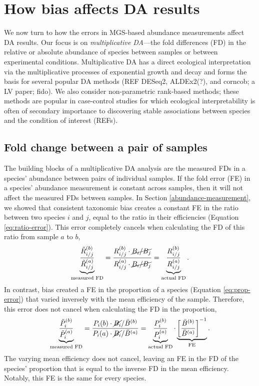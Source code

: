 \documentclass[
]{article}
\begin{document}
\hypertarget{differential-abundance}{%
\section{How bias affects DA results}\label{differential-abundance}}

We now turn to how the errors in MGS-based abundance measurements affect DA results.
Our focus is on \emph{multiplicative DA}---the fold differences (FD) in the relative or absolute abundance of species between samples or between experimental conditions.
Multiplicative DA has a direct ecological interpretation via the multiplicative processes of exponential growth and decay and forms the basis for several popular DA methods (REF DESeq2, ALDEx2(?), and corncob; a LV paper; fido).
We also consider non-parametric rank-based methods; these methods are popular in case-control studies for which ecological interpretability is often of secondary importance to discovering stable associations between species and the condition of interest (REFs).

\hypertarget{fold-change-between-a-pair-of-samples}{%
\subsection{Fold change between a pair of samples}\label{fold-change-between-a-pair-of-samples}}

The building blocks of a multiplicative DA analysis are the measured FDs in a species' abundance between pairs of individual samples.
If the fold error (FE) in a species' abundance measurement is constant across samples, then it will not affect the measured FDs between samples.
In Section \ref{abundance-measurement}, we showed that consistent taxonomic bias creates a constant FE in the ratio between two species \(i\) and \(j\), equal to the ratio in their efficiencies (Equation \eqref{eq:ratio-error}).
This error completely cancels when calculating the FD of this ratio from sample \(a\) to \(b\),
\begin{align}
  \label{eq:ratio-fc-error}
\underbrace{\frac{\tilde R_{i/j}^{(b)}}{\tilde R_{i/j}^{(a)}}}_\text{measured FD}
  = \frac
    {R_{i/j}^{(b)} \cdot \cancel{B_i / B_j}}
    {R_{i/j}^{(a)} \cdot \cancel{B_i / B_j}}
  =
  \underbrace{\frac{R_{i/j}^{(b)}}{R_{i/j}^{(a)}}}_\text{actual FD}
  .
\end{align}
In contrast, bias created a FE in the proportion of a species (Equation \eqref{eq:prop-error}) that varied inversely with the mean efficiency of the sample.
Therefore, this error does not cancel when calculating the FD in the proportion,
\begin{align}
  \label{eq:prop-fc-error}
\underbrace{\frac{\tilde P_i^{(b)}}{\tilde P_i^{(a)}}}_\text{measured FD}
  = \frac
    {P_i(b) \cdot \cancel{B_i} / \bar B^{(b)}}
    {P_i(a) \cdot \cancel{B_i} / \bar B^{(a)}}
  =
  \underbrace{\frac{P_i^{(b)}}{P_i^{(a)}}}_\text{actual FD}
  \cdot
  \underbrace{\left[\frac{\bar B^{(b)}}{\bar B^{(a)}}\right]^{-1}}_\text{FE}
  .
\end{align}
The varying mean efficiency does not cancel, leaving an FE in the FD of the species' proportion that is equal to the inverse FD in the mean efficiency.
Notably, this FE is the same for every species.
\end{document}
